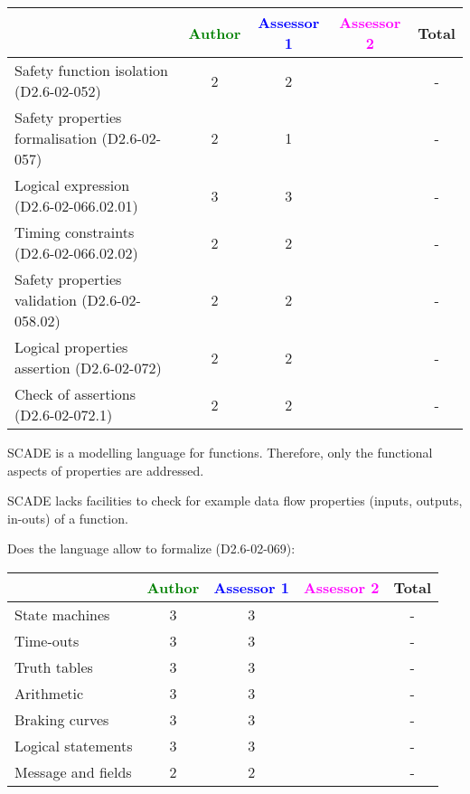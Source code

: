 \begin{tabular}{|l | c | c | c | c|}
\hline
& \textcolor{green}{Author} & \textcolor{blue}{Assessor 1} & \textcolor{magenta}{Assessor 2} & Total \\
\hline 
Safety function isolation (D2.6-02-052)  &  2& 2     & & - \\
\hline 
Safety properties formalisation (D2.6-02-057)  &  2&
1 & & - \\
\hline
Logical expression (D2.6-02-066.02.01)  &  3& 3     & & - \\
\hline
Timing constraints (D2.6-02-066.02.02)  &  2 & 2     & & - \\
\hline
Safety properties validation (D2.6-02-058.02)  &  2& 2     & & - \\
\hline
Logical properties assertion (D2.6-02-072)  &  2& 2     & & - \\
\hline
Check  of assertions (D2.6-02-072.1)  &  2& 2     & & - \\
\hline
\end{tabular}

\begin{author_comment}
SCADE is a modelling language for functions. Therefore, only the functional aspects of properties are addressed.  
\end{author_comment}


\begin{assessor1}
  SCADE lacks facilities to check for example data flow properties
  (inputs, outputs, in-outs) of a function.
\end{assessor1}


Does the language allow to  formalize (D2.6-02-069):

\begin{tabular}{|l | c | c | c | c|}
\hline
& \textcolor{green}{Author} & \textcolor{blue}{Assessor 1} & \textcolor{magenta}{Assessor 2} & Total \\
\hline 
State machines  & 3     & 3     & & - \\
\hline
Time-outs  & 3     & 3     & & - \\
\hline
Truth tables  & 3     & 3     & & - \\
\hline
Arithmetic  & 3     & 3     & & - \\
\hline
Braking curves  & 3     & 3     & & - \\
\hline
Logical statements & 3     & 3     & & - \\
\hline
Message and fields & 2     & 2     & & - \\
\hline
\end{tabular}

